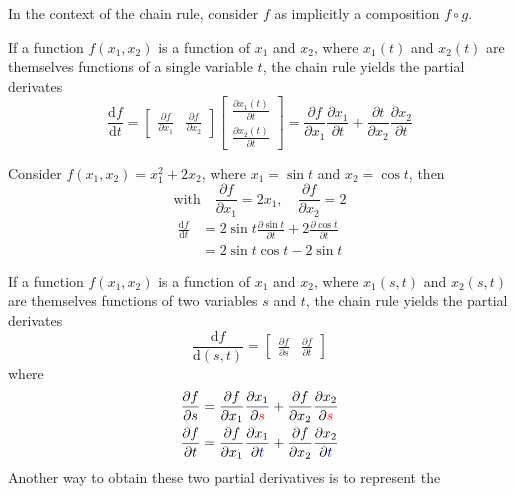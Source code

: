 \documentclass{article}
\begin{document}
In the context of the chain rule, consider $f$ as implicitly a composition
$f\circ g$.

If a function $f(x_1,x_2)$ is a function of $x_1$ and $x_2$, where
$x_1(t)$ and $x_2(t)$ are themselves functions of a single variable $t$, the
chain rule yields the partial derivates
$$\frac{\text{d}f}{\text{d}t}=\begin{bmatrix}
    \frac{\partial{f}}{\partial{x_1}} & \frac{\partial{f}}{\partial{x_2}}
    \end{bmatrix}\begin{bmatrix}
    \frac{\partial{x_1(t)}}{\partial{t}} \\ 
    \frac{\partial{x_2(t)}}{\partial{t}}
\end{bmatrix}=\frac{\partial{f}}{\partial{x_1}}\frac{\partial{x_1}}{\partial{t}}+\frac{\partial{t}}{\partial{x_2}}\frac{\partial{x_2}}{\partial{t}}$$
\newpage
\begin{example}
    Consider $f(x_1,x_2)=x_1^2+2x_2$, where $x_1=\sin t$ and $x_2=\cos t$,
    then
    $$\text{with}\quad\frac{\partial{f}}{\partial{x_1}}=2x_1,\quad \frac{\partial{f}}{\partial{x_2}}=2$$
    $$\begin{aligned}
        \frac{\text{d}f}{\text{d}t}&=2\sin t \frac{\partial{\sin t}}{\partial{t}}+2 \frac{\partial{\cos
        t}}{\partial t}\\
            &=2\sin t\cos t-2\sin t
    \end{aligned}$$
\end{example}
If a function $f(x_1,x_2)$ is a function of $x_1$ and $x_2$, where $x_1(s,t)$
and $x_2(s,t)$ are themselves functions of two variables $s$ and $t$, the
chain rule yields the partial derivates
$$
\frac{\text{d}f}{\text{d}(s,t)}=\begin{bmatrix}
    \frac{\partial{f}}{\partial{s}} & \frac{\partial{f}}{\partial{t}}
\end{bmatrix} 
$$
where 
$$
\begin{aligned}
    \frac{\partial{f}}{\partial{s}}&=\frac{\partial{f}}{\partial{x_1}}\frac{\partial{x_1}}{\partial{{\color{red}s}}}+\frac{\partial{f}}{\partial{x_2}}\frac{\partial{x_2}}{\partial{{\color{red}s}}}\\
    \frac{\partial{f}}{\partial{t}}&=\frac{\partial{f}}{\partial{x_1}}\frac{\partial{x_1}}{\partial{{\color{blue}t}}}+\frac{\partial{f}}{\partial{x_2}}\frac{\partial{x_2}}{\partial{{\color{blue}t}}}\\
\end{aligned}
$$
Another way to obtain these two partial derivatives is to represent the
\end{document}
